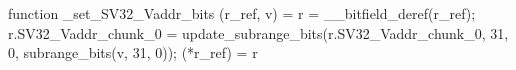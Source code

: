 function _set_SV32_Vaddr_bits (r_ref, v) = {
    r = __bitfield_deref(r_ref);
    r.SV32_Vaddr_chunk_0 = update_subrange_bits(r.SV32_Vaddr_chunk_0, 31, 0, subrange_bits(v, 31, 0));
    (*r_ref) = r
}
